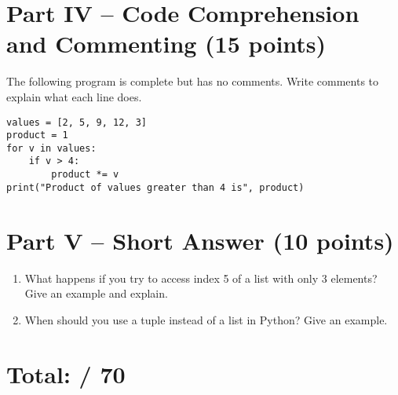 \documentclass[12pt]{article}
\begin{document}
\section*{Part IV – Code Comprehension and Commenting (15 points)}

The following program is complete but has no comments. Write comments to explain what each line does.

\begin{lstlisting}
values = [2, 5, 9, 12, 3]
product = 1
for v in values:
    if v > 4:
        product *= v
print("Product of values greater than 4 is", product)
\end{lstlisting}

\vspace{5cm}

\section*{Part V – Short Answer (10 points)}

\begin{enumerate}[resume,label=\arabic*.]
    \item What happens if you try to access index 5 of a list with only 3 elements? Give an example and explain.

    \vspace{3cm}

    \item When should you use a tuple instead of a list in Python? Give an example.

    \vspace{3cm}
\end{enumerate}

\section*{Total: \underline{\hspace{2cm}} / 70}
\end{document}
